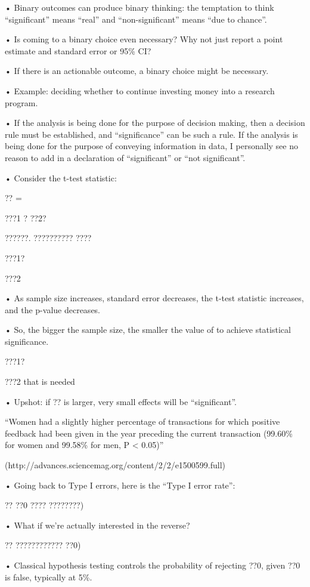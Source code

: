 \documentclass[
  letterpaper,
  DIV=11,
  numbers=noendperiod]{scrreprt}
\begin{document}
• Binary outcomes can produce binary thinking: the temptation to think
``significant'' means ``real'' and ``non-significant'' means ``due to
chance''.

• Is coming to a binary choice even necessary? Why not just report a
point estimate and standard error or 95\% CI?

• If there is an actionable outcome, a binary choice might be necessary.

• Example: deciding whether to continue investing money into a research
program.

• If the analysis is being done for the purpose of decision making, then
a decision rule must be established, and ``significance'' can be such a
rule. If the analysis is being done for the purpose of conveying
information in data, I personally see no reason to add in a declaration
of ``significant'' or ``not significant''.

• Consider the t-test statistic:

?? =

???1 ? ??2?

??????. ?????????? ????

???1?

???2

• As sample size increases, standard error decreases, the t-test
statistic increases, and the p-value decreases.

• So, the bigger the sample size, the smaller the value of to achieve
statistical significance.

???1?

???2 that is needed

• Upshot: if ?? is larger, very small effects will be ``significant''.

``Women had a slightly higher percentage of transactions for which
positive feedback had been given in the year preceding the current
transaction (99.60\% for women and 99.58\% for men, P \textless{}
0.05)''

(http://advances.sciencemag.org/content/2/2/e1500599.full)

• Going back to Type I errors, here is the ``Type I error rate'':

?? ??0 ???? ????????)

• What if we're actually interested in the reverse?

?? ???????????? ??0)

• Classical hypothesis testing controls the probability of rejecting
??0, given ??0 is false, typically at 5\%.
\end{document}
